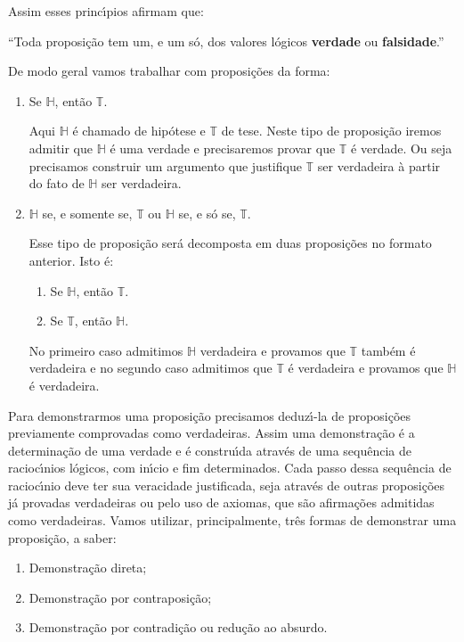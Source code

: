 Assim esses princ{\'\i}pios afirmam que:
\begin{center}
	``Toda proposi\c{c}\~ao tem um, e um s\'o, dos valores l\'ogicos \textbf{verdade} ou \textbf{falsidade}.''
\end{center}

De modo geral vamos trabalhar com proposi\c{c}\~oes da forma:
\begin{enumerate}[label={\roman*})]
	\item Se $\mathbb{H}$, ent\~ao $\mathbb{T}$.

	Aqui $\mathbb{H}$ \'e chamado de hip\'otese e $\mathbb{T}$ de tese. Neste tipo de proposi\c{c}\~ao iremos admitir que $\mathbb{H}$ \'e uma verdade e precisaremos provar que $\mathbb{T}$ \'e verdade. Ou seja precisamos construir um argumento que justifique $\mathbb{T}$ ser verdadeira \`a partir do fato de $\mathbb{H}$ ser verdadeira.

	\item $\mathbb{H}$ se, e somente se, $\mathbb{T}$ ou $\mathbb{H}$ se, e s\'o se, $\mathbb{T}$.

	Esse tipo de proposi\c{c}\~ao ser\'a decomposta em duas proposi\c{c}\~oes no formato anterior. Isto \'e:
	\begin{enumerate}[label={\alph*})]
		\item Se $\mathbb{H}$, ent\~ao $\mathbb{T}$.
		\item Se $\mathbb{T}$, ent\~ao $\mathbb{H}$.
	\end{enumerate}

	No primeiro caso admitimos $\mathbb{H}$ verdadeira e provamos que $\mathbb{T}$ tamb\'em \'e verdadeira e no segundo caso admitimos que $\mathbb{T}$ \'e verdadeira e provamos que $\mathbb{H}$ \'e verdadeira.
\end{enumerate}

Para demonstrarmos uma proposi\c{c}\~ao precisamos deduz{\'\i}-la de proposi\c{c}\~oes previamente comprovadas como verdadeiras. Assim uma demonstra\c{c}\~ao \'e a determina\c{c}\~ao de uma verdade e \'e constru{\'\i}da atrav\'es de uma sequ\^encia de racioc{\'\i}nios l\'ogicos, com in{\'\i}cio e fim determinados. Cada passo dessa sequ\^encia de racioc{\'\i}nio deve ter sua veracidade justificada, seja atrav\'es de outras proposi\c{c}\~oes j\'a provadas verdadeiras ou pelo uso de axiomas, que s\~ao afirma\c{c}\~oes admitidas como verdadeiras. Vamos utilizar, principalmente, tr\^es formas de demonstrar uma proposi\c{c}\~ao, a saber:
\begin{enumerate}[label={\roman*})]
	\item Demonstra\c{c}\~ao direta;
	\item Demonstra\c{c}\~ao por contraposi\c{c}\~ao;
	\item Demonstra\c{c}\~ao por contradi\c{c}\~ao ou redu\c{c}\~ao ao absurdo.
\end{enumerate}

